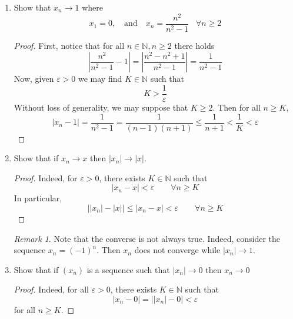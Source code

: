 \documentclass[12pt, reqno]{article}
\numberwithin{equation}{section}
\theoremstyle{definition}
\theoremstyle{remark}
\newtheorem{rem}{Remark}
\newcommand{\NN}{\mathbb{N}}
\newcommand{\abs}[1]{\left\lvert#1\right\rvert}
\renewcommand{\epsilon}{\varepsilon}
\begin{document}
\begin{enumerate}[leftmargin=*]
	      \begin{proof}
		      Given $\epsilon > 0$, we know (by the Archimedean Property) that there exists $K\in \NN$ such that
		      \[
			      K > \frac{\abs{b}}{\epsilon}
		      \]
		      Then for all $n\geq K$ there holds
		      \[
			      \abs{\frac{b}{n} - 0} = \frac{\abs{b}}{n} \leq \frac{\abs{b}}{K} < \epsilon
		      \]
		      Ergo, $\lim_{n\to\infty}\frac{b}{n} = 0$.
	      \end{proof}

	\item Show that $x_n \to 1$ where
	      \[
		      x_1 = 0,
		      \quad\text{and}\quad
		      x_n = \frac{n^2}{n^2 - 1} \,\,\,\,\,\forall n \geq 2
	      \]

	      \begin{proof}
		      First, notice that for all $n\in\NN, n\geq 2$ there holds
		      \[
			      \abs{\frac{n^2}{n^2-1} - 1} = \abs{\frac{n^2 - n^2 + 1}{n^2 - 1}} = \frac{1}{n^2 - 1}
		      \]
		      Now, given $\epsilon>0$ we may find $K\in \NN$ such that
		      \[
			      K > \frac{1}{\epsilon}
		      \]
		      Without loss of generality, we may suppose that $K\geq 2$. Then for all $n\geq K$,
		      \[
			      \abs{x_n -1} =  \frac{1}{n^2 - 1} = \frac{1}{(n-1)(n+1)} \leq \frac{1}{n+1} < \frac{1}{K} < \epsilon
		      \]
	      \end{proof}

	\item Show that if $x_n \to x$ then $\abs{x_n} \to \abs{x}$.

	      \begin{proof}
		      Indeed, for $\epsilon > 0$, there exists $K\in \NN$ such that
		      \[
			      \abs{x_n - x} < \epsilon \qquad\forall n\geq K
		      \]
		      In particular,
		      \[
			      \abs{\abs{x_n} - \abs{x}} \leq \abs{x_n - x}< \epsilon \qquad\forall n\geq K
		      \]
	      \end{proof}

	      \begin{rem}
		      Note that the converse is not always true. Indeed, consider the sequence $x_n = (-1)^n$. Then $x_n$ does not converge while $\abs{x_n} \to 1$.
	      \end{rem}

	\item Show that if $(x_n)$ is a sequence such that $\abs{x_n} \to 0$ then $x_n \to 0$

	      \begin{proof}
		      Indeed, for all $\epsilon > 0$, there exists $K\in \NN$ such that
		      \[
			      \abs{x_n - 0} = \abs{\abs{x_n} - 0} < \epsilon
		      \]
		      for all $n\geq K$.
	      \end{proof}
\end{enumerate}
\end{document}
